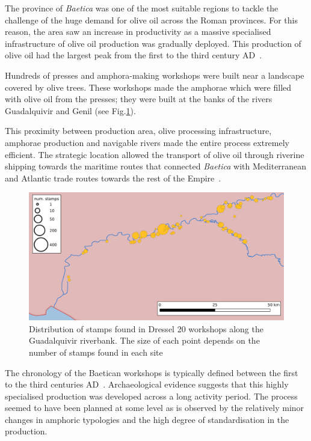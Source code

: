 The province of \textit{Baetica} was one of the most suitable regions to tackle the challenge of the huge demand for olive oil across the Roman provinces. For this reason, the area saw an increase in productivity as a massive specialised infrastructure of olive oil production was gradually deployed. This production of olive oil had the largest peak from the first to the third century AD~\citep{remesal_concierto}. 

Hundreds of presses and amphora-making workshops were built near a landscape covered by olive trees. These workshops made the amphorae which were filled with olive oil from the presses; they were built at the banks of the rivers Guadalquivir and Genil (see Fig.\ref{workshop}).

This proximity between production area, olive processing infrastructure, amphorae production and navigable rivers made the entire process extremely efficient. The strategic location allowed the transport of olive oil through riverine shipping towards the maritime routes that connected \textit{Baetica} with Mediterranean and Atlantic trade routes towards the rest of the Empire~\citep{garcia_vargas_enrique_formal_2010}.

\begin{figure}[htp]
	\centering
\includegraphics[width=\linewidth]{baetica}
\caption{Distribution of stamps found in Dressel 20 workshops along the Guadalquivir riverbank. The size of each point depends on the number of stamps found in each site}

\label{workshop}
\end{figure} 

The chronology of the Baetican workshops is typically defined between the first to the third centuries AD~\citep{millet_anforas_1998,rodriguez_baetican_1998,chic2005comercio}. Archaeological evidence suggests that this highly specialised production was developed across a long activity period\citep{remesal_anforas_2004}. The process seemed to have been planned at some level as is observed by the relatively minor changes in amphoric typologies and the high degree of standardisation in the production. 

